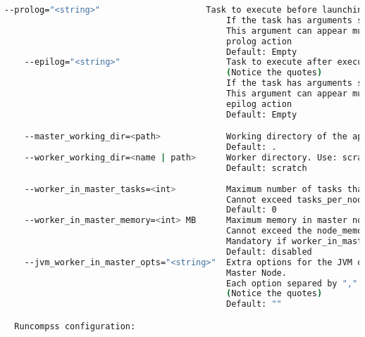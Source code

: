 \begin{lstlisting}[language=bash]
    --prolog="<string>"                     Task to execute before launching COMPSs (Notice the quotes)
                                            If the task has arguments split them by "," rather than spaces.
                                            This argument can appear multiple times for more than one 
                                            prolog action
                                            Default: Empty
    --epilog="<string>"                     Task to execute after executing the COMPSs application 
                                            (Notice the quotes)
                                            If the task has arguments split them by "," rather than spaces.
                                            This argument can appear multiple times for more than one 
                                            epilog action
                                            Default: Empty

    --master_working_dir=<path>             Working directory of the application
                                            Default: .
    --worker_working_dir=<name | path>      Worker directory. Use: scratch | gpfs | <path>
                                            Default: scratch
                                              
    --worker_in_master_tasks=<int>          Maximum number of tasks that the master node can run as worker.
                                            Cannot exceed tasks_per_node.
                                            Default: 0
    --worker_in_master_memory=<int> MB      Maximum memory in master node assigned to the worker. 
                                            Cannot exceed the node_memory.
                                            Mandatory if worker_in_master_tasks is specified.
                                            Default: disabled
    --jvm_worker_in_master_opts="<string>"  Extra options for the JVM of the COMPSs Worker in the 
                                            Master Node. 
                                            Each option separed by "," and without blank spaces 
                                            (Notice the quotes)
                                            Default: ""

  Runcompss configuration:
    

\end{lstlisting}
